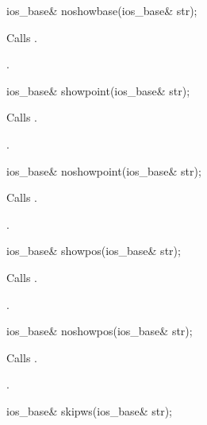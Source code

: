 %
\begin{itemdecl}
ios_base& noshowbase(ios_base& str);
\end{itemdecl}

\begin{itemdescr}
\pnum
\effects
Calls
.

\pnum
\returns
{}.
\end{itemdescr}

%
\begin{itemdecl}
ios_base& showpoint(ios_base& str);
\end{itemdecl}

\begin{itemdescr}
\pnum
\effects
Calls
.

\pnum
\returns
{}.
\end{itemdescr}

%
\begin{itemdecl}
ios_base& noshowpoint(ios_base& str);
\end{itemdecl}

\begin{itemdescr}
\pnum
\effects
Calls
.

\pnum
\returns
{}.
\end{itemdescr}

%
\begin{itemdecl}
ios_base& showpos(ios_base& str);
\end{itemdecl}

\begin{itemdescr}
\pnum
\effects
Calls
.

\pnum
\returns
{}.
\end{itemdescr}

%
\begin{itemdecl}
ios_base& noshowpos(ios_base& str);
\end{itemdecl}

\begin{itemdescr}
\pnum
\effects
Calls
.

\pnum
\returns
{}.
\end{itemdescr}

%
\begin{itemdecl}
ios_base& skipws(ios_base& str);
\end{itemdecl}

